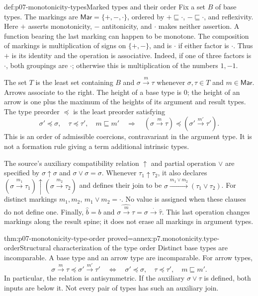 \begin{hbdefinition}{def:p07-monotonicity-types}{Marked types and their order}
Fix a set \(B\) of base types. The markings are
\(\mathsf{Mar}=\{+,-,\cdot\}\), ordered by
\( +\sqsubseteq\cdot\), \( -\sqsubseteq\cdot\), and reflexivity.
Here \(+\) asserts monotonicity, \(-\) antitonicity, and \(\cdot\) makes
neither assertion. A function bearing the last marking can happen to be
monotone. The composition of markings is multiplication of signs on
\(\{+,-\}\), and is \(\cdot\) if either factor is \(\cdot\).
Thus \(+\) is its identity and the operation is associative.
Indeed, if one of three factors is \(\cdot\), both groupings are
\(\cdot\); otherwise this is multiplication of the numbers \(1,-1\).

The set \(T\) is the least set containing \(B\) and
\(\sigma\xrightarrow{m}\tau\) whenever \(\sigma,\tau\in T\) and
\(m\in\mathsf{Mar}\). Arrows associate to the right.
The height of a base type is \(0\); the height of an arrow is one plus
the maximum of the heights of its argument and result types.
The type preorder \(\preceq\) is the least preorder satisfying
\[
 \sigma'\preceq\sigma,\quad \tau\preceq\tau',\quad
 m\sqsubseteq m'
 \quad\Longrightarrow\quad
 (\sigma\xrightarrow m\tau)
 \preceq(\sigma'\xrightarrow{m'}\tau').
\]
This is an order of admissible coercions, contravariant in the argument type.
It is not a formation rule giving a term additional intrinsic types.

The source's auxiliary compatibility relation \(\uparrow\) and partial
operation \(\vee\) are specified by
\(\sigma\uparrow\sigma\) and \(\sigma\vee\sigma=\sigma\).
Whenever \(\tau_1\uparrow\tau_2\), it also declares
\((\sigma\xrightarrow{m_1}\tau_1)\uparrow
  (\sigma\xrightarrow{m_2}\tau_2)\)
and defines their join to be
\(\sigma\xrightarrow{m_1\vee m_2}(\tau_1\vee\tau_2)\).
For distinct markings \(m_1,m_2\), \(m_1\vee m_2=\cdot\).
No value is assigned when these clauses do not define one.
Finally,
\(\widehat b=b\) and
\(\widehat{\sigma\xrightarrow m\tau}=
  \sigma\xrightarrow{\cdot}\widehat\tau\).
This last operation changes markings along the result spine; it does not
erase all markings in argument types.
\end{hbdefinition}

\begin{hblemma}{thm:p07-monotonicity-type-order}
 {proved=annex:p7.monotonicity.type-order}{Structural characterization of the type order}
Distinct base types are incomparable. A base type and an arrow type are
incomparable. For arrow types,
\[
 \sigma\xrightarrow m\tau\preceq\sigma'\xrightarrow{m'}\tau'
 \quad\Longleftrightarrow\quad
 \sigma'\preceq\sigma,\quad \tau\preceq\tau',\quad m\sqsubseteq m'.
\]
In particular, the relation is antisymmetric. If the auxiliary
\(\sigma\vee\tau\) is defined, both inputs are below it.
Not every pair of types has such an auxiliary join.
\end{hblemma}

